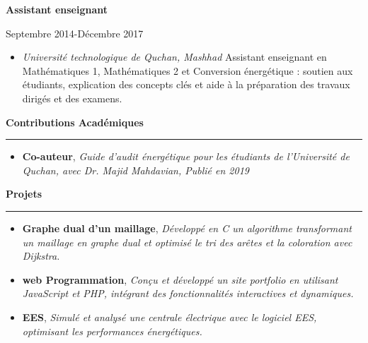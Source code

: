 \documentclass[a4paper]{letter}
\newcommand{\divider}{\rule{\linewidth}{0.9pt}}
\begin{document}
\begin{minipage}[t]{0.60\textwidth}
\vspace{3mm}

{ \textbf{Assistant enseignant}}

{ \footnotesize Septembre 2014-Décembre 2017}
\begin{itemize}
    \footnotesize \item \textit{Université technologique de Quchan, Mashhad}
    \newline
    Assistant enseignant en Mathématiques 1, Mathématiques 2 et Conversion énergétique : soutien aux étudiants, explication des concepts clés et aide à la préparation des travaux dirigés et des examens.
\end{itemize}





\vspace{3mm}


{\large \textbf{Contributions Académiques}}
\divider
\vspace{4mm}
\begin{itemize}
    \footnotesize \item {\textbf{Co-auteur}, \textit{Guide d’audit énergétique pour les étudiants de l’Université de Quchan, avec Dr. Majid Mahdavian, Publié en 2019}}


\end{itemize}

\vspace{3mm}



{\large \textbf{Projets}}
\divider
\vspace{4mm}
\begin{itemize}
    \footnotesize \item {\textbf{Graphe dual d’un maillage}, \textit{Développé en C un algorithme transformant un maillage en graphe dual et optimisé le tri des arêtes et la coloration avec Dijkstra.}}
    \vspace{2mm}
    \footnotesize \item {\textbf{web Programmation}, \textit{Conçu et développé un site portfolio en utilisant JavaScript et PHP, intégrant des fonctionnalités interactives et dynamiques.}}
    \vspace{2mm}
    \footnotesize \item {\textbf{EES}, \textit{Simulé et analysé une centrale électrique avec le logiciel EES, optimisant les performances énergétiques.}}



\end{itemize}
\end{minipage}
\end{document}
